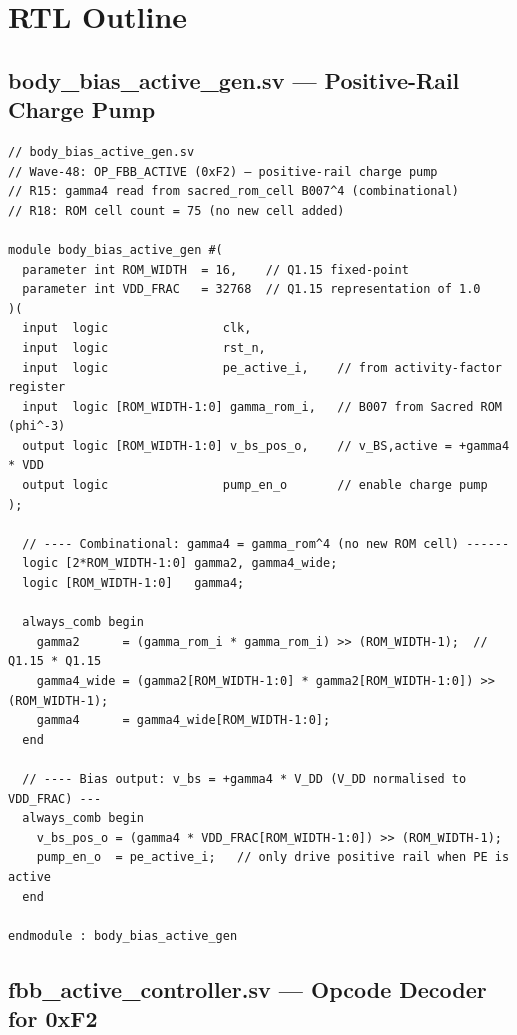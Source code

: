 \documentclass[12pt,a4paper]{report}
\theoremstyle{plain}
\theoremstyle{definition}
\theoremstyle{remark}
\begin{document}
\section{RTL Outline}
\label{sec:rtl}

\subsection{body\_bias\_active\_gen.sv — Positive-Rail Charge Pump}

\begin{lstlisting}[style=verilog,
  caption={body\_bias\_active\_gen.sv (positive-rail charge pump for FBB-ACTIVE).}]
// body_bias_active_gen.sv
// Wave-48: OP_FBB_ACTIVE (0xF2) — positive-rail charge pump
// R15: gamma4 read from sacred_rom_cell B007^4 (combinational)
// R18: ROM cell count = 75 (no new cell added)

module body_bias_active_gen #(
  parameter int ROM_WIDTH  = 16,    // Q1.15 fixed-point
  parameter int VDD_FRAC   = 32768  // Q1.15 representation of 1.0
)(
  input  logic                clk,
  input  logic                rst_n,
  input  logic                pe_active_i,    // from activity-factor register
  input  logic [ROM_WIDTH-1:0] gamma_rom_i,   // B007 from Sacred ROM (phi^-3)
  output logic [ROM_WIDTH-1:0] v_bs_pos_o,    // v_BS,active = +gamma4 * VDD
  output logic                pump_en_o       // enable charge pump
);

  // ---- Combinational: gamma4 = gamma_rom^4 (no new ROM cell) ------
  logic [2*ROM_WIDTH-1:0] gamma2, gamma4_wide;
  logic [ROM_WIDTH-1:0]   gamma4;

  always_comb begin
    gamma2      = (gamma_rom_i * gamma_rom_i) >> (ROM_WIDTH-1);  // Q1.15 * Q1.15
    gamma4_wide = (gamma2[ROM_WIDTH-1:0] * gamma2[ROM_WIDTH-1:0]) >> (ROM_WIDTH-1);
    gamma4      = gamma4_wide[ROM_WIDTH-1:0];
  end

  // ---- Bias output: v_bs = +gamma4 * V_DD (V_DD normalised to VDD_FRAC) ---
  always_comb begin
    v_bs_pos_o = (gamma4 * VDD_FRAC[ROM_WIDTH-1:0]) >> (ROM_WIDTH-1);
    pump_en_o  = pe_active_i;   // only drive positive rail when PE is active
  end

endmodule : body_bias_active_gen
\end{lstlisting}

\subsection{fbb\_active\_controller.sv — Opcode Decoder for 0xF2}
\end{document}

